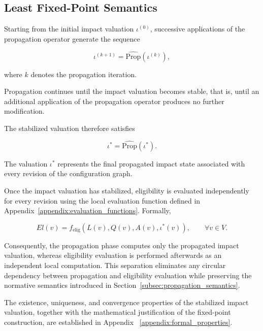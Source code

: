\documentclass[10pt]{article}
\begin{document}
\subsection{Least Fixed-Point Semantics}

Starting from the initial impact valuation $\iota^{(0)}$, successive applications of the propagation operator generate the sequence

\begin{equation}
	\label{eq:impact_iteration}
	\iota^{(k+1)}
	=
	\widehat{\mathrm{Prop}}
	\!\left(
	\iota^{(k)}
	\right),
\end{equation}

where $k$ denotes the propagation iteration.

Propagation continues until the impact valuation becomes stable, that is, until an additional application of the propagation operator produces no further modification.

The stabilized valuation therefore satisfies

\begin{equation}
	\label{eq:impact_fixed_point}
	\iota^{*}
	=
	\widehat{\mathrm{Prop}}
	\!\left(
	\iota^{*}
	\right).
\end{equation}

The valuation $\iota^{*}$ represents the final propagated impact state
associated with every revision of the configuration graph.

Once the impact valuation has stabilized, eligibility is evaluated
independently for every revision using the local evaluation function defined in Appendix~\ref{appendix:evaluation_functions}. Formally,

\begin{equation}
	\label{eq:eligibility_after_propagation}
	El(v)
	=
	f_{\mathrm{elig}}
	\!\left(
	L(v),
	Q(v),
	A(v),
	\iota^{*}(v)
	\right),
	\qquad
	\forall v\in V.
\end{equation}

Consequently, the propagation phase computes only the propagated impact
valuation, whereas eligibility evaluation is performed afterwards as an
independent local computation. This separation eliminates any circular
dependency between propagation and eligibility evaluation while preserving the normative semantics introduced in Section~\ref{subsec:propagation_semantics}.

The existence, uniqueness, and convergence properties of the stabilized impact valuation, together with the mathematical justification of the fixed-point construction, are established in Appendix ~\ref{appendix:formal_properties}.
\end{document}
